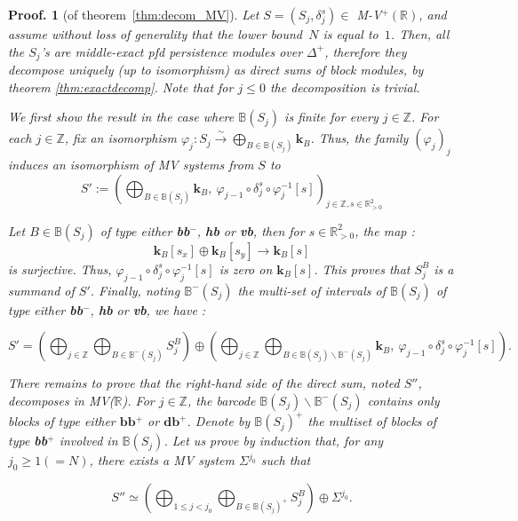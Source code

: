 \documentclass[a4paper, english, 11pt]{article}
\newcommand{\kk}[0]{\textbf{k}}
\newcommand{\0}{\vec{0}}
\newcommand{\R}[0]{\mathbb{R}}
\newcommand{\Z}[0]{\mathbb{Z}}
\newtheorem*{pf}{Proof.} }
\begin{document}
\begin{pf}[of theorem~\ref{thm:decom_MV}] 
Let $S =(S_j,\delta_j^s) \in $ M-V$^+ (\R)$, and assume without loss of generality that the lower bound~$N$ is equal to~$1$. Then, all the $S_j$'s are middle-exact pfd persistence modules over $\Delta^+$, therefore they decompose uniquely (up to isomorphism) as direct sums of block modules, by theorem \ref{thm:exactdecomp}. Note that for $j\leq 0$ the decomposition is trivial.

\medskip


We first show the result in the case where $\mathbb{B}(S_j)$ is finite for every $j\in\Z$.  For each $j\in\Z$, fix an isomorphism $\varphi_j : S_j \stackrel{\sim}{\longrightarrow}\bigoplus_{B\in\mathbb{B}(S_j)}\kk_B$. Thus, the family $(\varphi_j)_j$ induces an isomorphism of MV systems from $S$ to 
    $$S' := \left(\bigoplus_{B\in\mathbb{B}(S_j)}\kk_B, ~\varphi_{j-1}\circ \delta_j^s \circ \varphi_j^{-1}[s] \right )_{j\in\Z,s\in \R_{>0}^2}$$ 
  
  Let $B\in \mathbb{B}(S_j)$ of type either \textbf{bb}$^-$, \textbf{hb} or \textbf{vb}, then for $s\in \R_{>0}^2$, the map :  $$\kk_B[s_x]\oplus\kk_B[s_y]\longrightarrow \kk_B[s]$$ is surjective. Thus,  $\varphi_{j-1}\circ \delta_j^s \circ \varphi_j^{-1}[s]$ is zero on $\kk_B[s]$. This proves that $S^B_j$ is a summand of $S'$. Finally, noting $\mathbb{B}^{-}(S_j)$ the multi-set of intervals of $\mathbb{B}(S_j)$ of type either \textbf{bb}$^-$, \textbf{hb} or \textbf{vb}, we have : 
  
 $$S' = \left (\bigoplus_{j\in\Z} \bigoplus_{B\in  \mathbb{B}^{-}(S_j) } S^B_j \right ) \oplus \left (\bigoplus_{j\in\Z} \bigoplus_{B\in\mathbb{B}(S_j)\backslash \mathbb{B}^{-}(S_j)}\kk_B, ~\varphi_{j-1}\circ \delta_j^s \circ \varphi_j^{-1}[s] \right ).$$ 
 
 There remains to prove that the right-hand side of the direct sum, noted $S''$, decomposes in MV($\R$). For $j\in\Z$, the barcode $\mathbb{B}(S_j)\backslash \mathbb{B}^{-}(S_j)$ contains only blocks of type either $\textbf{bb$^+$}$ or $\textbf{db}^+$. Denote by $\mathbb{B}(S_j)^+$ the multiset of blocks of type \textbf{bb$^+$} involved in $\mathbb{B}(S_j)$.
 Let us prove by induction that, for any  $j_0\geq 1 (=N)$, there exists a MV system $\Sigma^{j_0}$ such that
 
 $$S'' \simeq \left ( \bigoplus_{1\leq j < j_0} \bigoplus_{B\in \mathbb{B}(S_j)^+ } S_j^B \right ) \oplus \Sigma^{j_0}.$$
 

\end{pf}
\end{document}

